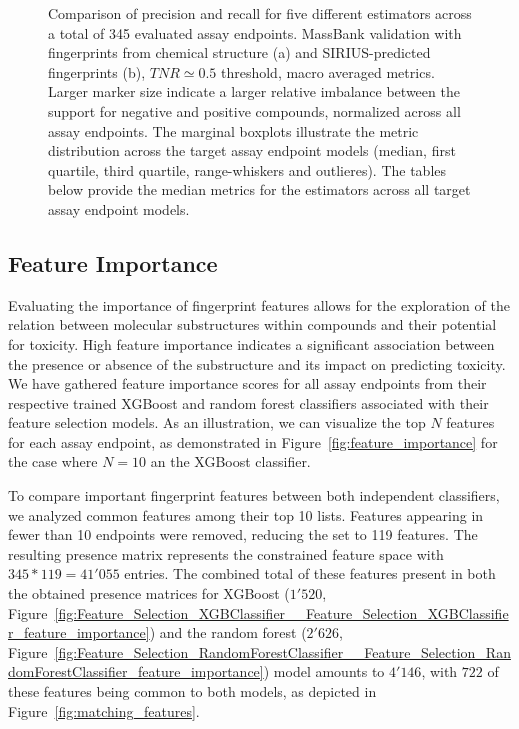 \begin{figure}[htbp]
\begin{subfigure}[b]{0.495\textwidth}
      \caption{}
      \label{fig:hitcall_classification_Feature_Selection_XGBClassifier_mb_val_sirius_tnr_macro_avg}
  \end{subfigure}
  \caption{Comparison of precision and recall for five different estimators across a total of 345 evaluated assay endpoints. MassBank validation with fingerprints from chemical structure (a) and SIRIUS-predicted fingerprints (b), $TNR \simeq 0.5$ threshold, macro averaged metrics. Larger marker size indicate a larger relative imbalance between the support for negative and positive compounds, normalized across all assay endpoints. The marginal boxplots illustrate the metric distribution across the target assay endpoint models (median, first quartile, third quartile, range-whiskers and outlieres). The tables below provide the median metrics for the estimators across all target assay endpoint models.}
  \label{fig:hitcall_classification_Feature_Selection_XGBClassifier_mb_val_tnr_macro_avg}
\end{figure}




\newpage
\subsection{Feature Importance}\label{sec:feature_importance}
Evaluating the importance of fingerprint features allows for the exploration of the relation between molecular substructures within compounds and their potential for toxicity. High feature importance indicates a significant association between the presence or absence of the substructure and its impact on predicting toxicity.
We have gathered feature importance scores for all assay endpoints from their respective trained XGBoost and random forest classifiers associated with their feature selection models. As an illustration, we can visualize the top $N$ features for each assay endpoint, as demonstrated in Figure~\ref{fig:feature_importance} for the case where $N=10$ an the XGBoost classifier.

To compare important fingerprint features between both independent classifiers, we analyzed common features among their top 10 lists. Features appearing in fewer than 10 endpoints were removed, reducing the set to 119 features. The resulting presence matrix represents the constrained feature space with $345 * 119 = 41'055$ entries. The combined total of these features present in both the obtained presence matrices for XGBoost ($1'520$, Figure~\ref{fig:Feature_Selection_XGBClassifier__Feature_Selection_XGBClassifier_feature_importance}) and the random forest ($2'626$, Figure~\ref{fig:Feature_Selection_RandomForestClassifier__Feature_Selection_RandomForestClassifier_feature_importance}) model amounts to $4'146$, with $722$ of these features being common to both models, as depicted in Figure~\ref{fig:matching_features}.

